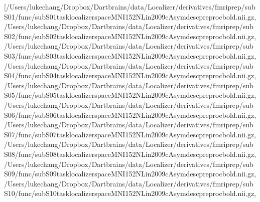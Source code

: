 \documentclass[letterpaper,10pt,english]{sphinxmanual}
\begin{document}
\begin{sphinxVerbatim}[commandchars=\\\{\}]
[\PYGZsq{}/Users/lukechang/Dropbox/Dartbrains/data/Localizer/derivatives/fmriprep/sub\PYGZhy{}S01/func/sub\PYGZhy{}S01\PYGZus{}task\PYGZhy{}localizer\PYGZus{}space\PYGZhy{}MNI152NLin2009cAsym\PYGZus{}desc\PYGZhy{}preproc\PYGZus{}bold.nii.gz\PYGZsq{},
 \PYGZsq{}/Users/lukechang/Dropbox/Dartbrains/data/Localizer/derivatives/fmriprep/sub\PYGZhy{}S02/func/sub\PYGZhy{}S02\PYGZus{}task\PYGZhy{}localizer\PYGZus{}space\PYGZhy{}MNI152NLin2009cAsym\PYGZus{}desc\PYGZhy{}preproc\PYGZus{}bold.nii.gz\PYGZsq{},
 \PYGZsq{}/Users/lukechang/Dropbox/Dartbrains/data/Localizer/derivatives/fmriprep/sub\PYGZhy{}S03/func/sub\PYGZhy{}S03\PYGZus{}task\PYGZhy{}localizer\PYGZus{}space\PYGZhy{}MNI152NLin2009cAsym\PYGZus{}desc\PYGZhy{}preproc\PYGZus{}bold.nii.gz\PYGZsq{},
 \PYGZsq{}/Users/lukechang/Dropbox/Dartbrains/data/Localizer/derivatives/fmriprep/sub\PYGZhy{}S04/func/sub\PYGZhy{}S04\PYGZus{}task\PYGZhy{}localizer\PYGZus{}space\PYGZhy{}MNI152NLin2009cAsym\PYGZus{}desc\PYGZhy{}preproc\PYGZus{}bold.nii.gz\PYGZsq{},
 \PYGZsq{}/Users/lukechang/Dropbox/Dartbrains/data/Localizer/derivatives/fmriprep/sub\PYGZhy{}S05/func/sub\PYGZhy{}S05\PYGZus{}task\PYGZhy{}localizer\PYGZus{}space\PYGZhy{}MNI152NLin2009cAsym\PYGZus{}desc\PYGZhy{}preproc\PYGZus{}bold.nii.gz\PYGZsq{},
 \PYGZsq{}/Users/lukechang/Dropbox/Dartbrains/data/Localizer/derivatives/fmriprep/sub\PYGZhy{}S06/func/sub\PYGZhy{}S06\PYGZus{}task\PYGZhy{}localizer\PYGZus{}space\PYGZhy{}MNI152NLin2009cAsym\PYGZus{}desc\PYGZhy{}preproc\PYGZus{}bold.nii.gz\PYGZsq{},
 \PYGZsq{}/Users/lukechang/Dropbox/Dartbrains/data/Localizer/derivatives/fmriprep/sub\PYGZhy{}S07/func/sub\PYGZhy{}S07\PYGZus{}task\PYGZhy{}localizer\PYGZus{}space\PYGZhy{}MNI152NLin2009cAsym\PYGZus{}desc\PYGZhy{}preproc\PYGZus{}bold.nii.gz\PYGZsq{},
 \PYGZsq{}/Users/lukechang/Dropbox/Dartbrains/data/Localizer/derivatives/fmriprep/sub\PYGZhy{}S08/func/sub\PYGZhy{}S08\PYGZus{}task\PYGZhy{}localizer\PYGZus{}space\PYGZhy{}MNI152NLin2009cAsym\PYGZus{}desc\PYGZhy{}preproc\PYGZus{}bold.nii.gz\PYGZsq{},
 \PYGZsq{}/Users/lukechang/Dropbox/Dartbrains/data/Localizer/derivatives/fmriprep/sub\PYGZhy{}S09/func/sub\PYGZhy{}S09\PYGZus{}task\PYGZhy{}localizer\PYGZus{}space\PYGZhy{}MNI152NLin2009cAsym\PYGZus{}desc\PYGZhy{}preproc\PYGZus{}bold.nii.gz\PYGZsq{},
 \PYGZsq{}/Users/lukechang/Dropbox/Dartbrains/data/Localizer/derivatives/fmriprep/sub\PYGZhy{}S10/func/sub\PYGZhy{}S10\PYGZus{}task\PYGZhy{}localizer\PYGZus{}space\PYGZhy{}MNI152NLin2009cAsym\PYGZus{}desc\PYGZhy{}preproc\PYGZus{}bold.nii.gz\PYGZsq{},

\end{sphinxVerbatim}
\end{document}
